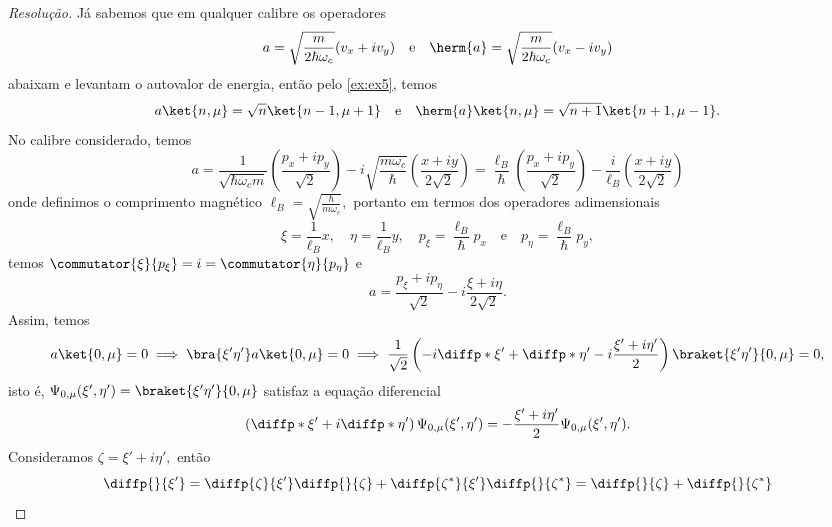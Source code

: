 \begin{proof}[Resolução]
   Já sabemos que em qualquer calibre os operadores
   \begin{equation*}
      a = \sqrt{\frac{m}{2 \hbar \omega_c}} (v_x + i v_y)
      \quad\text{e}\quad
      \herm{a} = \sqrt{\frac{m}{2 \hbar \omega_c}} (v_x - i v_y)
   \end{equation*}
   abaixam e levantam o autovalor de energia, então pelo \cref{ex:ex5}, temos
   \begin{equation*}
      a \ket{n,\mu} = \sqrt{n} \ket{n-1, \mu + 1}\quad\text{e}\quad \herm{a}\ket{n,\mu} = \sqrt{n+1} \ket{n+1, \mu - 1}.
   \end{equation*}
   No calibre considerado, temos
   \begin{equation*}
      a = \frac{1}{\sqrt{\hbar \omega_c m}} \left(\frac{p_x + i p_y}{\sqrt{2}}\right) - i\sqrt{\frac{m \omega_c}{\hbar}} \left(\frac{x + iy}{2\sqrt{2}}\right) = \frac{\ell_B}{\hbar} \left(\frac{p_x + i p_y}{\sqrt{2}}\right) - \frac{i}{\ell_B}\left(\frac{x + i y}{2\sqrt{2}}\right) 
   \end{equation*}
   onde definimos o comprimento magnético \(\ell_B = \sqrt{\frac{\hbar}{m \omega_c}},\) portanto em termos dos operadores adimensionais
   \begin{equation*}
      \xi = \frac{1}{\ell_B}x,\quad
      \eta = \frac{1}{\ell_B}y,\quad
      p_\xi = \frac{\ell_B}{\hbar}p_x\quad\text{e}\quad
      p_\eta = \frac{\ell_B}{\hbar}p_y,
   \end{equation*}
   temos \(\commutator{\xi}{p_\xi} = i = \commutator{\eta}{p_\eta}\) e 
   \begin{equation*}
      a = \frac{p_\xi + i p_\eta}{\sqrt{2}} - i\frac{\xi + i \eta}{2\sqrt{2}}.
   \end{equation*}
   Assim, temos
   \begin{equation*}
      a\ket{0,\mu} = 0 \implies \bra{\xi'\eta'}a\ket{0,\mu} = 0 \implies \frac{1}{\sqrt{2}}\left(-i\diffp*{}{\xi'} + \diffp*{}{\eta'} -i \frac{\xi' + i \eta'}{2}\right)\braket{\xi'\eta'}{0,\mu} = 0,
   \end{equation*}
   isto é, \(\Psi_{0,\mu}(\xi', \eta') = \braket{\xi'\eta'}{0,\mu}\) satisfaz a equação diferencial
   \begin{equation*}
      \left(\diffp*{}{\xi'} + i \diffp*{}{\eta'}\right)\Psi_{0,\mu}(\xi', \eta') = -\frac{\xi' + i \eta'}{2} \Psi_{0,\mu}(\xi', \eta').
   \end{equation*}
   Consideramos \(\zeta = \xi' + i \eta',\) então
   \begin{equation*}
      \diffp{}{\xi'} = \diffp{\zeta}{\xi'} \diffp{}{\zeta} + \diffp{\zeta^*}{\xi'} \diffp{}{\zeta^*} = \diffp{}{\zeta} + \diffp{}{\zeta^*}

\end{equation*}
\end{proof}
